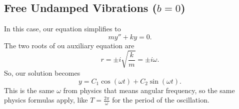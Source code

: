 \subsection{Free Undamped Vibrations ($b = 0$)}
\noindent
In this case, our equation simplifies to
\begin{equation*}
	my'' + ky = 0.
\end{equation*}
The two roots of ou auxiliary equation are
\begin{equation*}
	r = \pm i \sqrt{\frac{k}{m}} = \pm i\omega.
\end{equation*}
So, our solution becomes
\begin{equation*}
	y = C_1\cos{(\omega t)} + C_2\sin{(\omega t)}.
\end{equation*}
This is the same $\omega$ from physics that means angular frequency, so the same physics formulas apply, like $T = \frac{2\pi}{\omega}$ for the period of the oscillation.\\

